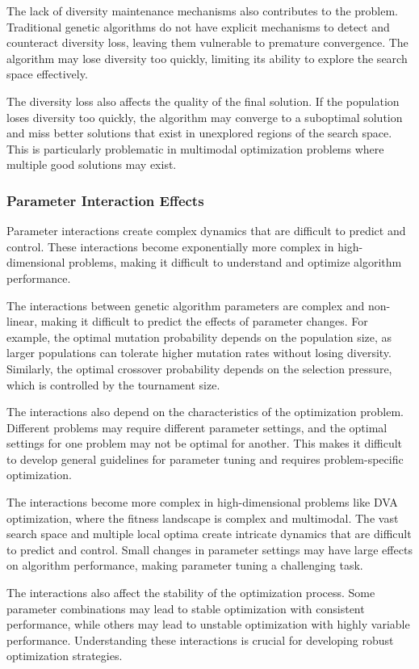 \documentclass[12pt,a4paper]{article}
\begin{document}
The lack of diversity maintenance mechanisms also contributes to the problem. Traditional genetic algorithms do not have explicit mechanisms to detect and counteract diversity loss, leaving them vulnerable to premature convergence. The algorithm may lose diversity too quickly, limiting its ability to explore the search space effectively.

The diversity loss also affects the quality of the final solution. If the population loses diversity too quickly, the algorithm may converge to a suboptimal solution and miss better solutions that exist in unexplored regions of the search space. This is particularly problematic in multimodal optimization problems where multiple good solutions may exist.

\subsubsection{Parameter Interaction Effects}

Parameter interactions create complex dynamics that are difficult to predict and control. These interactions become exponentially more complex in high-dimensional problems, making it difficult to understand and optimize algorithm performance.

The interactions between genetic algorithm parameters are complex and non-linear, making it difficult to predict the effects of parameter changes. For example, the optimal mutation probability depends on the population size, as larger populations can tolerate higher mutation rates without losing diversity. Similarly, the optimal crossover probability depends on the selection pressure, which is controlled by the tournament size.

The interactions also depend on the characteristics of the optimization problem. Different problems may require different parameter settings, and the optimal settings for one problem may not be optimal for another. This makes it difficult to develop general guidelines for parameter tuning and requires problem-specific optimization.

The interactions become more complex in high-dimensional problems like DVA optimization, where the fitness landscape is complex and multimodal. The vast search space and multiple local optima create intricate dynamics that are difficult to predict and control. Small changes in parameter settings may have large effects on algorithm performance, making parameter tuning a challenging task.

The interactions also affect the stability of the optimization process. Some parameter combinations may lead to stable optimization with consistent performance, while others may lead to unstable optimization with highly variable performance. Understanding these interactions is crucial for developing robust optimization strategies.
\end{document}

